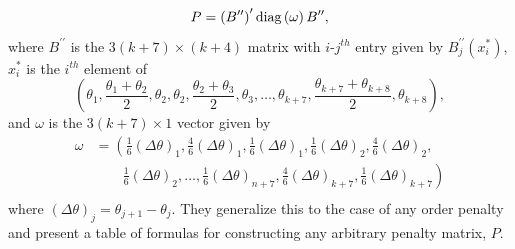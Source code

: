  \[
 P = \left(B^{\prime \prime}\right)^\prime \textup{diag}\left(\omega \right) B^{\prime \prime}, 
 \]
 \noindent
 where $B^{\prime \prime}$ is the $3\left( k + 7 \right) \times \left( k + 4 \right)$ matrix with $i$-$j^{th}$ entry given by $B_j^{\prime \prime} \left(x_i^*\right)$, $x^*_i$ is the $i^{th}$ element of 
\[
\left( \theta_1,\frac{\theta_1+\theta_2}{2},\theta_2,\theta_2,\frac{\theta_2+\theta_3}{2},\theta_3,\dots,\theta_{k+7},\frac{\theta_{k+7}+\theta_{k+8}}{2},\theta_{k+8} \right),
\]
 \noindent
 and $\omega$ is the $3\left(k+7\right) \times 1$ vector given by
\begin{align*}
\omega &= \left( \frac{1}{6}\left(\Delta \theta \right)_1,\frac{4}{6}\left(\Delta \theta \right)_1, \frac{1}{6}\left(\Delta \theta \right)_1,\frac{1}{6}\left(\Delta \theta \right)_2, \frac{4}{6}\left(\Delta \theta \right)_2,  \right. \\
&\qquad   \left. {} \frac{1}{6}\left(\Delta \theta \right)_2 , \dots , \frac{1}{6}\left(\Delta \theta \right)_{n+7}, \frac{4}{6}\left(\Delta \theta \right)_{k+7}, \frac{1}{6}\left(\Delta \theta \right)_{k+7}  \right) \\
\end{align*}
\noindent
where $\left(\Delta \theta \right)_j = \theta_{j+1}-\theta_j$. They generalize this to the case of any order penalty and present a table of formulas for constructing any arbitrary penalty matrix, $P$.  

\bigskip

